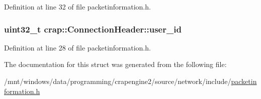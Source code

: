 Definition at line 32 of file packetinformation.\+h.

\hypertarget{structcrap_1_1_connection_header_a034507ceab327eb570a50ae9ccc86924}{}
\subsubsection[{user\+\_\+id}]{\setlength{\rightskip}{0pt plus 5cm}uint32\+\_\+t crap\+::\+Connection\+Header\+::user\+\_\+id}\label{structcrap_1_1_connection_header_a034507ceab327eb570a50ae9ccc86924}


Definition at line 28 of file packetinformation.\+h.



The documentation for this struct was generated from the following file\+:\begin{DoxyCompactItemize}
\item 
/mnt/windows/data/programming/crapengine2/source/network/include/\hyperlink{packetinformation_8h}{packetinformation.\+h}\end{DoxyCompactItemize}
